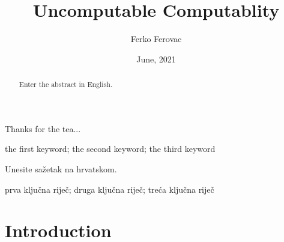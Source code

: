 \documentclass[masterthesis]{fer}
\title{Uncomputable Computablity}
\author{Ferko Ferovac}
\date{June, 2021}
\begin{document}
\maketitle






\begin{zahvale}
  Thanks for the tea...
\end{zahvale}


\mainmatter



\begin{abstract}
  Enter the abstract in English.
  
  \blindtext 
\end{abstract}

\begin{keywords}
  the first keyword; the second keyword; the third keyword
\end{keywords}


\begin{sazetak}
  Unesite sažetak na hrvatskom.

  \blindtext
\end{sazetak}

\begin{kljucnerijeci}
  prva ključna riječ; druga ključna riječ; treća ključna riječ
\end{kljucnerijeci}


\tableofcontents


\chapter{Introduction}
\label{chp:introduction}
\end{document}
